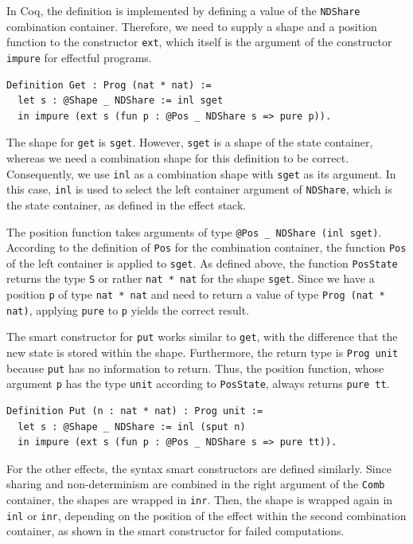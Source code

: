 \documentclass[a4paper, 11pt, fleqn, twoside, abstract=on]{scrreprt}
\newcommand{\hinl}[1]{\texttt{#1}}
\newcommand{\cinl}[1]{\texttt{#1}}
\begin{document}
In Coq, the definition is implemented by defining a value of the \cinl{NDShare} combination container.
Therefore, we need to supply a shape and a position function to the constructor \cinl{ext}, which itself is the argument of  the constructor \cinl{impure} for effectful programs.
\pagebreak
\begin{verbatim}
Definition Get : Prog (nat * nat) :=
  let s : @Shape _ NDShare := inl sget
  in impure (ext s (fun p : @Pos _ NDShare s => pure p)).
\end{verbatim}
\noindent
The shape for \hinl{get} is \cinl{sget}.
However, \cinl{sget} is a shape of the state container, whereas we need a combination shape for this definition to be correct.
Consequently, we use \cinl{inl} as a combination shape with \cinl{sget} as its argument.
In this case, \cinl{inl} is used to select the left container argument of \cinl{NDShare}, which is the state container, as defined in the effect stack.

The position function takes arguments of type \cinl{@Pos _ NDShare (inl sget)}.
According to the definition of \cinl{Pos} for the combination container, the function \cinl{Pos} of the left container is applied to \cinl{sget}.
As defined above, the function \cinl{PosState} returns the type \cinl{S} or rather \cinl{nat * nat} for the shape \cinl{sget}.
Since we have a position \cinl{p} of type \cinl{nat * nat} and need to return a value of type \cinl{Prog (nat * nat)}, applying \cinl{pure} to \cinl{p} yields the correct result.

The smart constructor for \hinl{put} works similar to \hinl{get}, with the difference that the new state is stored within the shape.
Furthermore, the return type is \cinl{Prog unit} because \hinl{put} has no information to return.
Thus, the position function, whose argument \cinl{p} has the type \cinl{unit} according to \cinl{PosState}, always returns \cinl{pure tt}.

\begin{verbatim}
Definition Put (n : nat * nat) : Prog unit :=
  let s : @Shape _ NDShare := inl (sput n)
  in impure (ext s (fun p : @Pos _ NDShare s => pure tt)).
\end{verbatim}

For the other effects, the syntax smart constructors are defined similarly.
Since sharing and non-determinism are combined in the right argument of the \cinl{Comb} container, the shapes are wrapped in \cinl{inr}.
Then, the shape is wrapped again in \cinl{inl} or \cinl{inr}, depending on the position of the effect within the second combination container, as shown in the smart constructor for failed computations.
\end{document}
